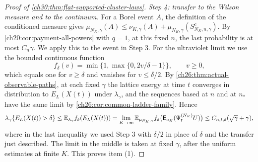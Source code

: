 \begin{proof}[Proof of \cref{ch30:thm:flat-supported-cluster-laws}]
\emph{Step 4: transfer to the Wilson measure and to the continuum.} For a Borel event $A$, the definition of the conditioned measure gives $\mu_{N_K,\gamma}(A)\le\nu_{K,\gamma}(A)+\mu_{N_K,\gamma}(S_{N_K,n,\gamma}^c)$. By \cref{ch20:cor:payment-all-powers} with $q=1$, at this fixed $n$, the last probability is at most $C_n\gamma$. We apply this to the event in Step 3. For the ultraviolet limit we use the bounded continuous function
\[
 f_\delta(v)=\min\{1,\max\{0,2v/\delta-1\}\},\qquad v\ge0,
\]
which equals one for $v\ge\delta$ and vanishes for $v\le\delta/2$. By \cref{ch26:thm:actual-observable-paths}, at each fixed $\gamma$ the lattice energy at time $t$ converges in distribution to $E_L(X(t))$ under $\lambda_\gamma$, and the sequences based at $n$ and at $n_*$ have the same limit by \cref{ch26:cor:common-ladder-family}. Hence
\[
 \lambda_\gamma\{E_L(X(t))>\delta\}\le\mathbb E_{\lambda_\gamma}f_\delta(E_L(X(t)))=\lim_{K\to\infty}\mathbb E_{\mu_{N_K,\gamma}}f_\delta\bigl(\mathsf E_{a_K}(\Psi^{(N_K)}_tU)\bigr)\le C_{n,t,\delta}(\sqrt\gamma+\gamma),
\]
where in the last inequality we used Step 3 with $\delta/2$ in place of $\delta$ and the transfer just described. The limit in the middle is taken at fixed $\gamma$, after the uniform estimates at finite $K$. This proves item (1).


\end{proof}
